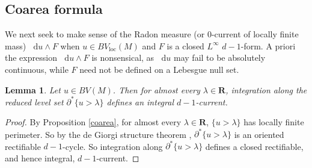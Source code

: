 \documentclass[reqno,11pt]{amsart}
\newcommand{\RR}{\mathbf{R}}
\newcommand*\dif{\mathop{}\!\mathrm{d}}
\newcommand{\loc}{\mathrm{loc}}
\newtheorem{lemma}[theorem]{Lemma}
\theoremstyle{definition}
\numberwithin{equation}{section}
\begin{document}
\subsection{Coarea formula}
We next seek to make sense of the Radon measure (or $0$-current of locally finite mass) $\dif u \wedge F$ when $u \in BV_\loc(M)$ and $F$ is a closed $L^\infty$ $d - 1$-form.
A priori the expression $\dif u \wedge F$ is nonsensical, as $\dif u$ may fail to be absolutely continuous, while $F$ need not be defined on a Lebesgue null set.


\begin{lemma}\label{reduced level sets are integral currents}
Let $u \in BV(M)$.
Then for almost every $\lambda \in \RR$, integration along the reduced level set $\partial^* \{u > \lambda\}$ defines an integral $d - 1$-current.
\end{lemma}
\begin{proof}
By Proposition \ref{coarea}, for almost every $\lambda \in \RR$, $\{u > \lambda\}$ has locally finite perimeter.
So by the de Giorgi structure theorem \cite[Theorem 14.3]{Simon84}, $\partial^* \{u > \lambda\}$ is an oriented rectifiable $d - 1$-cycle.
So integration along $\partial^* \{u > \lambda\}$ defines a closed rectifiable, and hence integral, $d - 1$-current.
\end{proof}
\end{document}
